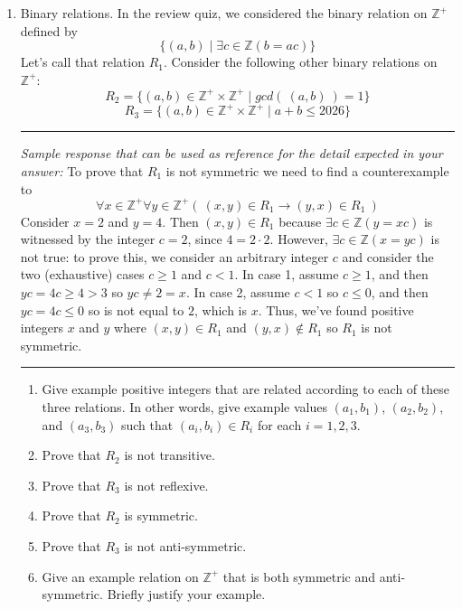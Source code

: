 \documentclass[12pt, oneside]{article}
\begin{document}
\begin{enumerate}[labelindent=0pt, leftmargin=0pt]
    \item Binary relations. In the review quiz, we considered the binary relation on 
    $\mathbb{Z}^+$ defined by 
    \[\{(a,b) \mid \exists c \in \mathbb{Z}(b = ac)\}
    \]
    Let's call that relation $R_1$.
    Consider the following other binary relations on $\mathbb{Z}^{+}$:
    \[
    R_2 = \{ (a,b) \in \mathbb{Z}^+ \times \mathbb{Z}^+ \mid gcd (~ (a,b) ~) = 1\}    
    \]
    \[
    R_3 = \{ (a,b) \in \mathbb{Z}^+ \times \mathbb{Z}^+ \mid a+b \leq 2026\}    
    \]


    \rule{0.5\textwidth}{.4pt}
    
    {\it Sample response that can be used as reference for the detail expected 
    in your answer:} 
    To prove that $R_1$ is not symmetric we need to find a counterexample 
    to 
    \[
        \forall x \in \mathbb{Z}^+ \forall y \in \mathbb{Z}^+ \left(~(x,y) \in R_1 \to (y,x) \in R_1 ~\right)
    \]
    Consider $x = 2$ and $y=4$. Then $(x,y) \in R_1$ because $\exists c \in \mathbb{Z} ( y = xc )$ is witnessed
    by the integer $c = 2$, since $4 = 2 \cdot 2$. However, $\exists c  \in \mathbb{Z} ( x = yc )$ is not
    true: to prove this, we consider an arbitrary integer $c$ and consider the two 
    (exhaustive) cases $c \geq 1$ and $c < 1$. 
    In case 1,
    assume $c \geq 1$, and then $yc = 4c \geq 4 > 3$ so $yc \neq 2 = x$. In case 2, assume $c < 1$ so $c \leq 0$,
    and then $yc = 4c \leq 0$ so is not equal to $2$, which is $x$. Thus, we've found positive integers 
    $x$ and $y$ where $(x,y) \in R_1$ and $(y,x) \notin R_1$ so $R_1$ is not symmetric.

    \rule{0.5\textwidth}{.4pt}
    


    \begin{enumerate}
        \item Give example positive integers that are related
        according to each of these three relations. In other words, give 
        example values $(a_1, b_1)$, $(a_2, b_2)$, and $(a_3, b_3)$ such that
        $(a_i, b_i) \in R_i$ for each $i =1,2,3$.
        \item Prove that $R_2$ is not transitive.
        \item Prove that $R_3$ is not reflexive.
        \item Prove that $R_2$ is symmetric. 
        \item Prove that $R_3$ is not anti-symmetric.
        \item Give an example relation on $\mathbb{Z}^+$ that is both symmetric and anti-symmetric.
        Briefly justify your example.
        \end{enumerate}
    


\end{enumerate}
\end{document}
